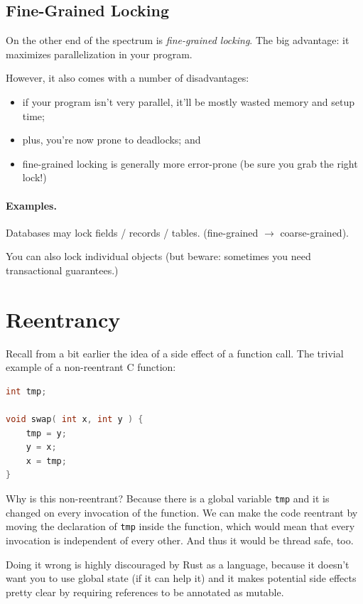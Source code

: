 \subsection*{Fine-Grained Locking}
On the other end of the spectrum is \emph{fine-grained locking}. The big
advantage: it maximizes parallelization in your program.

However, it also comes with a number of disadvantages: \\ \vspace*{-3em}
  \begin{itemize}[noitemsep]
    \item if your program isn't very parallel, it'll be mostly wasted memory and setup time;
    \item plus, you're now prone to deadlocks; and
    \item fine-grained locking is generally more error-prone (be sure you grab the right lock!)
  \end{itemize}

\paragraph{Examples.}

    Databases may lock fields / records / tables. (fine-grained $\rightarrow$ coarse-grained).

    You can also lock individual objects (but beware: sometimes you need transactional guarantees.)

\section*{Reentrancy}

Recall from a bit earlier the idea of a side effect of a function call.
The trivial example of a non-reentrant C function:
\begin{lstlisting}[language=C]
int tmp;

void swap( int x, int y ) {
    tmp = y;
    y = x;
    x = tmp;
}
\end{lstlisting}

Why is this non-reentrant? Because there is a global variable \texttt{tmp} and it is changed on every invocation of the function. We can make the code reentrant by moving the declaration of \texttt{tmp} inside the function, which would mean that every invocation is independent of every other. And thus it would be thread safe, too.

Doing it wrong is highly discouraged by Rust as a language, because it doesn't want you to use global state (if it can help it) and it makes potential side effects pretty clear by requiring references to be annotated as mutable.

